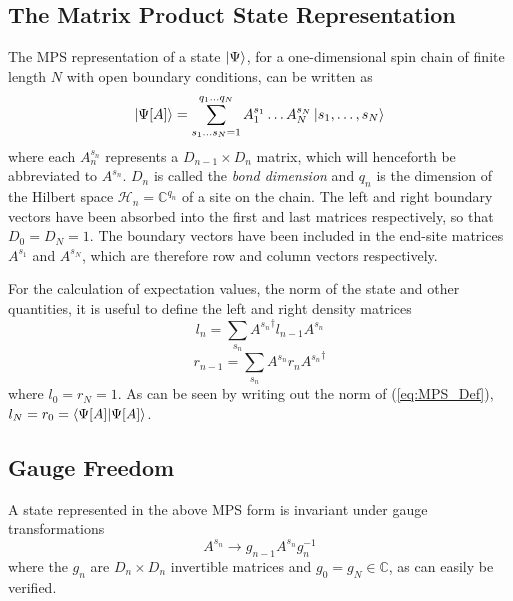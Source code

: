 \documentclass[a4paper,11pt]{article}
\begin{document}
\subsection{The Matrix Product State Representation}
The MPS representation of a state $\ket{\Psi}$, for a one-dimensional spin chain 
of finite length $N$ with open boundary conditions, can be written as
\begin{equation}
    \ket{\Psi[A]} = \sum_{s_1 \dots s_N=1}^{q_1 \dots q_N} A_{1}^{s_1} \dots A_{N}^{s_N} \ket{s_1, \dots , s_N}
    \label{eq:MPS_Def}
\end{equation}
where each $A_n^{s_n}$ represents a $D_{n - 1} \times D_n$ matrix, which will 
henceforth be abbreviated to $A^{s_n}$.
$D_n$ is called the \emph{bond dimension} %
and $q_n$ is the dimension of the Hilbert space
$\mathcal{H}_n = \mathbb{C}^{q_n}$ of a site on the chain. The left and right 
boundary vectors have been absorbed into the first and last matrices respectively,
so that $D_0 = D_N = 1$.
The boundary vectors have been included
in the end-site matrices $A^{s_1}$ and $A^{s_N}$, which are therefore row and column
vectors respectively.

For the calculation of expectation values, the norm of the state and other
quantities, it is useful to define the left and right density matrices
\begin{equation}
	l_n = \sum_{s_n} {A^{s_n}}^\dagger l_{n-1} A^{s_n}
	\label{eq:Dens_L}
\end{equation}
\begin{equation}
	r_{n - 1} = \sum_{s_n} A^{s_n}  r_{n} {A^{s_n}}^\dagger
	\label{eq:Dens_R}
\end{equation}
where $l_0 = r_N = 1$. As can be seen by writing out the norm of (\ref{eq:MPS_Def}),
$l_N = r_0 = \braket{\Psi[A] | \Psi[A]}$.

\subsection{Gauge Freedom}
A state represented in the above MPS form is invariant under gauge transformations
\begin{equation}
    A^{s_n} \rightarrow g_{n - 1} A^{s_n} g_{n}^{-1}
    \label{eq:MPS_GF}
\end{equation}
where the $g_n$ are $D_n \times D_n$ invertible matrices and $g_0 = g_N \in \mathbb{C}$, 
as can easily be verified.
\end{document}

